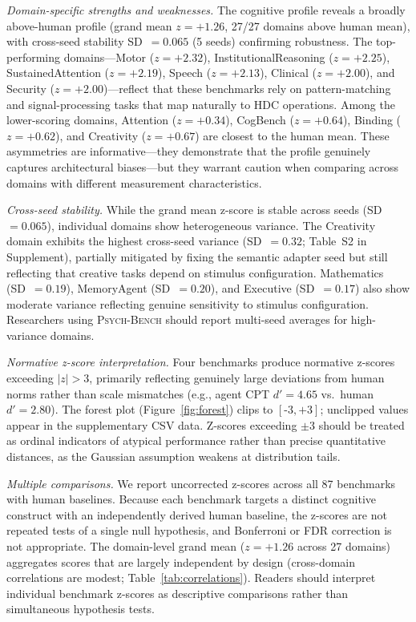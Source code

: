 \documentclass[11pt,letterpaper]{article}
\newcommand{\psychbench}{\textsc{Psych-Bench}}
\begin{document}
\emph{Domain-specific strengths and weaknesses.} The cognitive profile reveals a broadly above-human profile (grand mean $z = +1.26$, 27/27 domains above human mean), with cross-seed stability SD~$= 0.065$ (5 seeds) confirming robustness. The top-performing domains---Motor ($z = +2.32$), InstitutionalReasoning ($z = +2.25$), SustainedAttention ($z = +2.19$), Speech ($z = +2.13$), Clinical ($z = +2.00$), and Security ($z = +2.00$)---reflect that these benchmarks rely on pattern-matching and signal-processing tasks that map naturally to HDC operations. Among the lower-scoring domains, Attention ($z = +0.34$), CogBench ($z = +0.64$), Binding ($z = +0.62$), and Creativity ($z = +0.67$) are closest to the human mean. These asymmetries are informative---they demonstrate that the profile genuinely captures architectural biases---but they warrant caution when comparing across domains with different measurement characteristics.

\emph{Cross-seed stability.} While the grand mean z-score is stable across seeds (SD~$= 0.065$), individual domains show heterogeneous variance. The Creativity domain exhibits the highest cross-seed variance (SD~$= 0.32$; Table~S2 in Supplement), partially mitigated by fixing the semantic adapter seed but still reflecting that creative tasks depend on stimulus configuration. Mathematics (SD~$= 0.19$), MemoryAgent (SD~$= 0.20$), and Executive (SD~$= 0.17$) also show moderate variance reflecting genuine sensitivity to stimulus configuration. Researchers using \psychbench{} should report multi-seed averages for high-variance domains.

\emph{Normative z-score interpretation.} Four benchmarks produce normative z-scores exceeding $|z| > 3$, primarily reflecting genuinely large deviations from human norms rather than scale mismatches (e.g., agent CPT $d' {=} 4.65$ vs.\ human $d' {=} 2.80$). The forest plot (Figure~\ref{fig:forest}) clips to $[\text{-}3, \text{+}3]$; unclipped values appear in the supplementary CSV data. Z-scores exceeding $\pm 3$ should be treated as ordinal indicators of atypical performance rather than precise quantitative distances, as the Gaussian assumption weakens at distribution tails.

\emph{Multiple comparisons.} We report uncorrected z-scores across all 87 benchmarks with human baselines. Because each benchmark targets a distinct cognitive construct with an independently derived human baseline, the z-scores are not repeated tests of a single null hypothesis, and Bonferroni or FDR correction is not appropriate. The domain-level grand mean ($z = +1.26$ across 27 domains) aggregates scores that are largely independent by design (cross-domain correlations are modest; Table~\ref{tab:correlations}). Readers should interpret individual benchmark z-scores as descriptive comparisons rather than simultaneous hypothesis tests.
\end{document}
